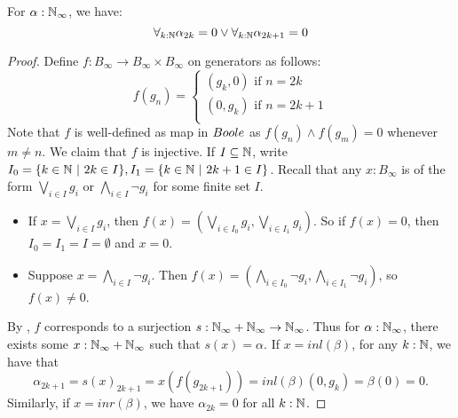 \begin{theorem}\label{LLPO}
  For $\alpha:\mathbb{N}_\infty$, 
  we have: 
  \begin{equation}\label{eqnLLPO}
    \forall_{k:\mathbb{N}} \alpha_{2k} = 0  \vee \forall_{k:\mathbb{N}} \alpha_{2k+1} = 0
  \end{equation}
\end{theorem}
\begin{proof}
%
  Define $f:B_\infty \to B_\infty \times B_\infty$ on generators as follows:
  \begin{equation}\label{eqnLLPOProofMap}
    f(g_n) =\begin{cases}
      (g_k,0) \text{ if } n = 2k\\
      (0,g_k) \text{ if } n = 2k+1\\
    \end{cases}
  \end{equation}
  Note that $f$ is well-defined as map in $\Boole$ as 
  $f(g_n) \wedge f(g_m) = 0$ whenever $m\neq n$. 
  We claim that $f$ is injective. 
  If $I\subseteq \mathbb{N}$, write 
  $ I_0 =\{k\in \mathbb{N}\ |\ 2k \in I\}, 
    I_1 =\{k\in \mathbb{N}\ |\ 2k+1 \in I\}
  $.
  Recall that any $x:B_\infty$ is of the form 
  $\bigvee_{i\in I} g_i$ or $\bigwedge_{i\in I} \neg g_i$ for some finite set $I$. 
  \begin{itemize}
    \item If $x = \bigvee_{i\in I} g_i$, then 
      $f(x) = (\bigvee_{i\in I_0}g_{i}, \bigvee_{i\in I_1}g_i)$. 
      So if $f(x) = 0$, then $I_0=I_1 = I = \emptyset$ and $x = 0$. 
    \item Suppose 
      $x = \bigwedge_{i\in I} \neg g_i$.
      Then $f(x) = (\bigwedge_{i\in I_0} \neg g_i, \bigwedge_{i\in I_1} \neg g_i)$, 
      so $f(x) \neq 0$. 
  \end{itemize}
  By ,
  $f$ corresponds to a surjection 
  $s:\mathbb{N}_{\infty} + \mathbb{N}_{\infty} \to \mathbb{N}_{\infty}$.
  Thus for $\alpha : \mathbb{N}_{\infty}$, 
  there exists some $x:\mathbb{N}_{\infty} + \mathbb{N}_{\infty}$ such that $s(x) = \alpha$. 
  If $x = inl(\beta)$, 
  for any $k:\mathbb{N}$, we have that 
  $$\alpha_{2k+1} = s(x)_{2k+1} = x(f(g_{2k+1})) = inl(\beta) (0,g_k)  = \beta(0) = 0.$$
  Similarly, if $x = inr(\beta)$, we have $\alpha_{2k} = 0$ for all $k:\mathbb{N}$. 
\end{proof}
